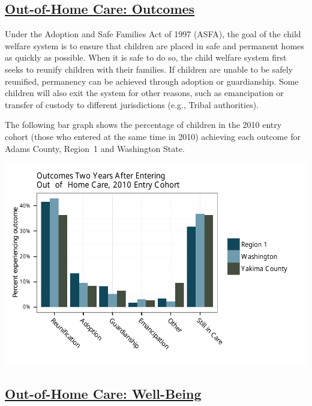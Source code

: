\documentclass{article}\usepackage[]{graphicx}\usepackage[]{color}
\makeatletter
\def\maxwidth{ %
  \ifdim\Gin@nat@width>\linewidth
    \linewidth
  \else
    \Gin@nat@width
  \fi
}
\newenvironment{knitrout}{}{} %
\makeatother
\begin{document}
\subsection{\href{http://www.partnersforourchildren.org/child-well-being/visualizations/out-home-care/outcomes}
    {Out-of-Home Care: Outcomes}
}
Under the Adoption and Safe Families Act of 1997 (ASFA), the goal of the child welfare system is to ensure that children are placed in safe and permanent homes as quickly as possible. When it is safe to do so, the child welfare system first seeks to reunify children with their families. If children are unable to be safely reunified, permanency can be achieved through adoption or guardianship. Some children will also exit the system for other reasons, such as emancipation or transfer of custody to different jurisdictions (e.g., Tribal authorities).

The following bar graph shows the percentage of children in the 2010 entry cohort (those who entered at the same time in 2010) achieving each outcome for Adams County, Region~1 and Washington State.
\nopagebreak[3]
\begin{knitrout}
\color{fgcolor}

{\centering \includegraphics[width=\maxwidth]{figure/ooh_outcomes} 

}



\end{knitrout}


\newpage

\subsection{\href{http://www.partnersforourchildren.org/child-well-being/visualizations/out-home-care/well-being}
    {Out-of-Home Care: Well-Being}
}
\end{document}
